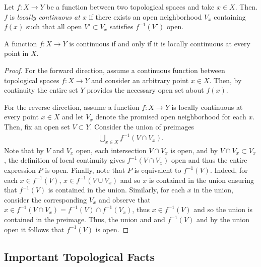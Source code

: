 \documentclass[../sean_thesis.tex]{subfiles}
\begin{document}

\begin{definition}
	Let $f: X \to Y$ be a function between two topological spaces and take $x \in X$. Then. $f$ is \emph{locally continuous at $x$} if there exists an open neighborhood $V_x$  containing $f(x)$ such that all open $V' \subset V_x$ satisfies $f^{-1}(V')$ open.
\end{definition}

\begin{claim}
	A function $f: X \to Y$ is continuous if and only if it is locally continuous at every point in $X$.
\end{claim}
\begin{proof}
	For the forward direction, assume a continuous function between topological spaces $f: X \to Y$ and consider an arbitrary point $x \in X$. Then, by continuity the entire set $Y$ provides the necessary open set about $f(x)$.
	
	For the reverse direction, assume a function $f: X \to Y$ is locally continuous at every point $x \in X$ and let $V_x$ denote the promised open neighborhood for each $x$. Then, fix an open set $V \subset Y$. Consider the union of preimages
	\begin{align*}
		\bigcup_{x \in X} f^{-1}(V \cap V_x).
	\end{align*}
	Note that by $V$ and $V_x$ open, each intersection $V \cap V_x$ is open, and by $V \cap V_x \subset V_x$, the definition of local continuity gives $f^{-1}(V \cap V_x)$ open and thus the entire expression $P$ is open. Finally, note that $P$ is equivalent to $f^{-1}(V)$. Indeed, for each $x \in f^{-1}(V)$, $x \in f^{-1}(V \cup V_x)$ and so $x$ is contained in the union ensuring that $f^{-1}(V)$ is contained in the union. Similarly, for each $x$ in the union, consider the corresponding $V_x$ and observe that $x \in f^{-1}(V \cap V_x) = f^{-1}(V) \cap f^{-1}(V_x)$, thus $x \in f^{-1}(V)$ and so the union is contained in the preimage. Thus, the union and and $f^{-1}(V)$ and by the union open it follows that $f^{-1}(V)$ is open.
\end{proof}

\subsection{Important Topological Facts}
%
%
\end{document}
